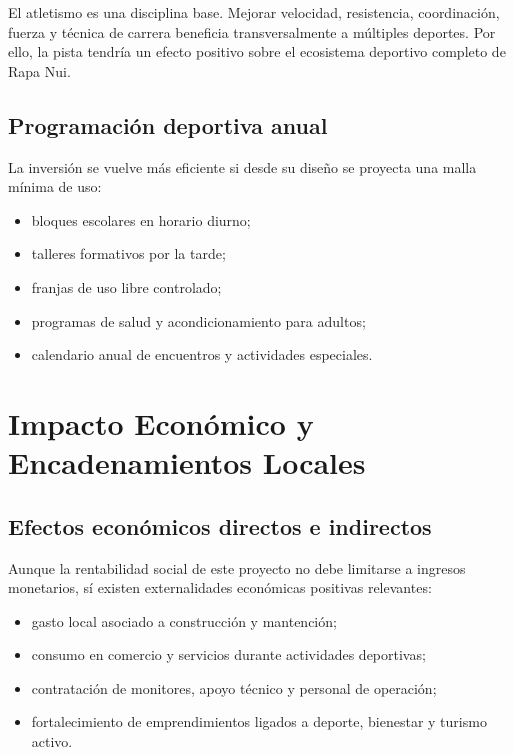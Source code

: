 \documentclass[12pt,letterpaper]{article}
\begin{document}
El atletismo es una disciplina base. Mejorar velocidad, resistencia, coordinación, fuerza y técnica de carrera beneficia transversalmente a múltiples deportes. Por ello, la pista tendría un efecto positivo sobre el ecosistema deportivo completo de Rapa Nui.

\subsection{Programación deportiva anual}

La inversión se vuelve más eficiente si desde su diseño se proyecta una malla mínima de uso:

\begin{itemize}
    \item bloques escolares en horario diurno;
    \item talleres formativos por la tarde;
    \item franjas de uso libre controlado;
    \item programas de salud y acondicionamiento para adultos;
    \item calendario anual de encuentros y actividades especiales.
\end{itemize}

\section{Impacto Económico y Encadenamientos Locales}

\subsection{Efectos económicos directos e indirectos}

Aunque la rentabilidad social de este proyecto no debe limitarse a ingresos monetarios, sí existen externalidades económicas positivas relevantes:

\begin{itemize}
    \item gasto local asociado a construcción y mantención;
    \item consumo en comercio y servicios durante actividades deportivas;
    \item contratación de monitores, apoyo técnico y personal de operación;
    \item fortalecimiento de emprendimientos ligados a deporte, bienestar y turismo activo.
\end{itemize}
\end{document}
